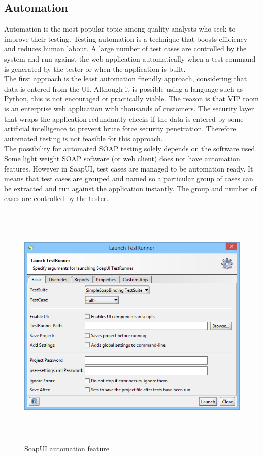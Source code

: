 \documentclass[12pt]{article}
\begin{document}
\subsection{Automation}
Automation is the most popular topic among quality analysts who seek to improve their testing. Testing automation is a technique that boosts efficiency and reduces human labour. A large number of test cases are controlled by the system and run against the web application automatically when a test command is generated by the tester or when the application is built.\\

The first approach is the least automation friendly approach, considering that data is entered from the UI. Although it is possible using a language such as Python, this is not encouraged or practically viable. The reason is that VIP room is an enterprise web application with thousands of customers. The security layer that wraps the application redundantly checks if the data is entered by some artificial intelligence to prevent brute force security penetration. Therefore automated testing is not feasible for this approach.\\

The possibility for automated SOAP testing solely depends on the software used. Some light weight SOAP software (or web client) does not have automation features. However in SoapUI, test cases are managed to be automation ready. It means that test cases are grouped and named so a particular group of cases can be extracted and run against the application instantly. The group and number of cases are controlled by the tester.

\begin{figure}[ht!]
\centering
\includegraphics[width=12cm,height=12cm,keepaspectratio]{img/soapAuto.jpg}
\caption{SoapUI automation feature}
\label{overflow}
\end{figure}
\end{document}

